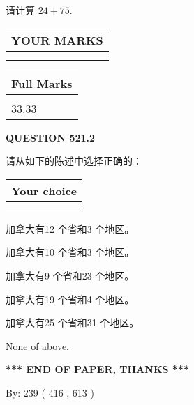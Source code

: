 \documentclass{ctexart}
\begin{document}
  
 
请计算 $ %
24 +  %
75 $.
 

 

 
  
\vspace{0.2in}
  
\noindent\begin{tabular}{|l|}
\hline
 YOUR MARKS  \\
\hline
 \\ 
 \\ 
\hline
\end{tabular}
\hspace{0.05in} \begin{tabular}{|l|}
\hline
 Full Marks  \\
\hline
 \\ 
33.33 \\
\hline
\end{tabular}
{\textbf{\Large{QUESTION
521.2 
}}}
  
  
请从如下的陈述中选择正确的：
  
  
\noindent\hspace{3.0in} \begin{tabular}{|l|}
\hline
Your choice \\
\hline
 \\ 
 \\ 
\hline
\end{tabular}
  
  
 
 
加拿大有12 个省和3 个地区。
 
 
加拿大有10 个省和3 个地区。
 
 
加拿大有9 个省和23 个地区。
 
 
加拿大有19 个省和4 个地区。
 
 
加拿大有25 个省和31 个地区。
 
 
 None of above.
 
 
   
   
 \vspace{0.2in}
 
   
   
   
   
\vspace{1.0in} 
{\textbf{\large{ *** END OF PAPER, THANKS *** }}} 
   
   
\hspace{1.0in} By: 
 239 ( 416 ,  613 )
   
\end{document}
